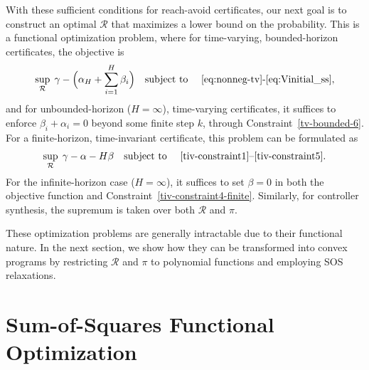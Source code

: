 \documentclass[journal,twoside,web]{ieeecolor}
\newcommand{\RA}{\mathcal{R}}
\newcommand{\refhere}{{\color{red} ref here}}
\theoremstyle{definition}
\theoremstyle{plain}
\theoremstyle{plain}
\begin{document}
With these sufficient conditions for reach-avoid certificates, our next goal is to construct an optimal $\RA$ that maximizes a lower bound on the probability. 
This is a functional optimization problem, where for time-varying, bounded-horizon certificates, the objective is
\begin{align}
    \label{eq: functional opt time-varying}
    \sup_{\RA} \; \gamma - \Big( \alpha_H + \sum_{i=1}^{H} \beta_i \Big) \quad \text{subject to \quad \eqref{eq:nonneg-tv}-\eqref{eq:Vinitial_ss}},
\end{align}
and for unbounded-horizon ($H = \infty$), time-varying certificates, it suffices to enforce $\beta_i + \alpha_i = 0$ beyond some finite step $k$, through Constraint~\eqref{tv-bounded-6}.  
For a finite-horizon, time-invariant certificate, this problem can be formulated as
\begin{align}
    \label{eq: functional opt time-invariant}
    \sup_{\RA} \;  \gamma - \alpha - H\beta  \quad \text{subject to \quad \eqref{tiv-constraint1}–\eqref{tiv-constraint5}}.
\end{align}
For the infinite-horizon case ($H = \infty$), it suffices to set $\beta = 0$ in both the objective function and Constraint~\eqref{tiv-constraint4-finite}.
Similarly, for controller synthesis, the supremum is taken over both $\RA$ and $\pi$.

These optimization problems are generally intractable due to their functional nature. In the next section, we show how they can be transformed into convex programs by restricting $\RA$ and $\pi$ to polynomial functions and employing SOS relaxations.

 
\section{Sum-of-Squares Functional Optimization}


\end{document}
